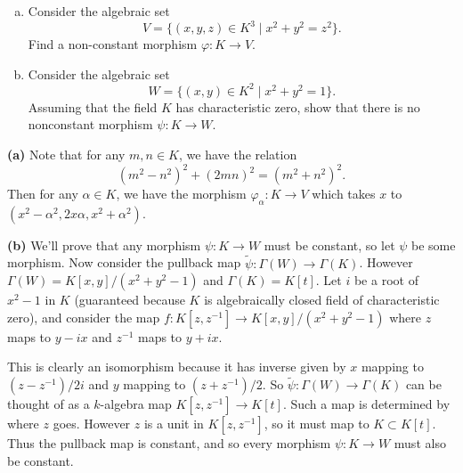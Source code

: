 \documentclass[11pt,letterpaper]{article}
\begin{document}
\begin{problem}\noindent
    \begin{enumerate}[(a)]
        \item Consider the algebraic set
        \[
            V=\{(x,y,z)\in K^3\mid x^2+y^2=z^2\}.
        \]
        Find a non-constant morphism $\varphi:K\rightarrow V$.
        \item Consider the algebraic set
        \[
            W=\{(x,y)\in K^2\mid x^2+y^2=1\}.
        \]
        Assuming that the field $K$ has characteristic zero, show that there is no nonconstant morphism $\psi:K\rightarrow W$. 
    \end{enumerate}
\end{problem}

\begin{solution}
    \textbf{(a)} Note that for any $m,n\in K$, we have the relation
    \[
        (m^2-n^2)^2+(2mn)^2=(m^2+n^2)^2
    .\] 
    Then for any $\alpha\in K$, we have the morphism $\varphi_\alpha : K \to V$ which takes $x$ to $(x^2-\alpha^2, 2x\alpha, x^2+\alpha^2)$.
    
    \textbf{(b)} We'll prove that any morphism $\psi : K \to W$ must be constant, so let $\psi$ be some morphism. Now consider the pullback map $\widetilde{\psi} : \Gamma(W) \to \Gamma(K)$. However $\Gamma(W)=K[x,y]/(x^2+y^2-1)$ and $\Gamma(K)=K[t]$. Let $i$ be a root of $x^2-1$ in $K$ (guaranteed because $K$ is algebraically closed field of characteristic zero), and consider the map $f : K[z,z^{-1}] \to K[x,y]/(x^2+y^2-1)$ where $z$ maps to $y-ix$ and $z^{-1}$ maps to $y+ix$. 
    
    This is clearly an isomorphism because it has inverse given by $x$ mapping to $(z-z^{-1}) /2i$ and $y$ mapping to $(z+z^{-1}) /2$. So $\widetilde{\psi} : \Gamma(W) \to \Gamma(K)$ can be thought of as a $k$-algebra map $K[z, z^{-1}] \to K[t]$. Such a map is determined by where $z$ goes. However $z$ is a unit in $K[z,z^{-1}]$, so it must map to $K\subset K[t]$. Thus the pullback map is constant, and so every morphism $\psi : K \to W$ must also be constant.
\end{solution}
\end{document}
